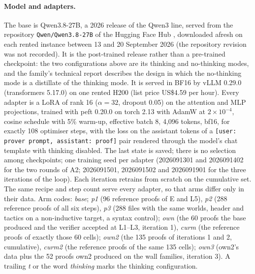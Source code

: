 \documentclass[11pt]{article}
\begin{document}
\paragraph{Model and adapters.} The base is Qwen3.8-27B, a 2026 release of the Qwen3 line, served from the repository \texttt{Qwen/Qwen3.8-27B} of the Hugging Face Hub \citep{qwen2026qwen38}, downloaded afresh on each rented instance between 13 and 20 September 2026 (the repository revision was not recorded). It is the post-trained release rather than a pre-trained checkpoint: the two configurations above are its thinking and no-thinking modes, and the family's technical report \citep{qwen2025qwen3} describes the design in which the no-thinking mode is a distillate of the thinking mode. It is served in BF16 by vLLM 0.29.0 (transformers 5.17.0) on one
rented H200 (list price US\$4.59 per hour). Every adapter is a LoRA
\citep{hu2022lora} of rank 16 ($\alpha=32$, dropout 0.05) on the
attention and MLP projections, trained with peft 0.20.0 on torch 2.13
with AdamW at $2\times10^{-4}$, cosine schedule with 5\% warm-up,
effective batch 8, 4,096 tokens, bf16, for exactly 108 optimiser steps,
with the loss on the assistant tokens of a \texttt{[user: prover prompt,
assistant: proof]} pair rendered through the model's chat template with
thinking disabled. The last state is saved; there is no selection among
checkpoints; one training seed per adapter (2026091301 and 2026091402 for
the two rounds of A2; 2026091501, 2026091502 and 2026091901 for the three
iterations of the loop). Each iteration retrains from scratch on the
cumulative set. The same recipe and step count serve every adapter, so
that arms differ only in their data. Arm codes: \emph{base}; \emph{p1}
(96 reference proofs of E and L5), \emph{p2} (288 reference proofs of all
six steps), \emph{p3} (288 files with the same worlds, header and tactics
on a non-inductive target, a syntax control); \emph{own} (the 60 proofs
the base produced and the verifier accepted at L1--L3, iteration 1),
\emph{curm} (the reference proofs of exactly those 60 cells); \emph{own2}
(the 135 proofs of iterations 1 and 2, cumulative), \emph{curm2} (the
reference proofs of the same 135 cells); \emph{own3} (own2's data plus
the 52 proofs own2 produced on the wall families, iteration 3). A
trailing \emph{t} or the word \emph{thinking} marks the thinking
configuration.
\end{document}
